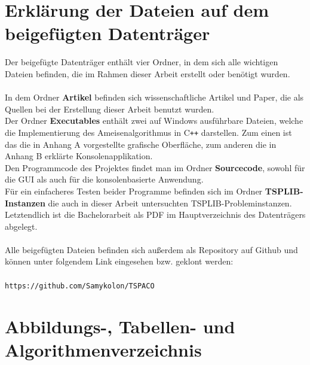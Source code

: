\documentclass[doktyp=barbeit, sprache=german]{TUBAFarbeiten}
\begin{document}
\section{Erklärung der Dateien auf dem beigefügten Datenträger}
Der beigefügte Datenträger enthält vier Ordner, in dem sich alle wichtigen Dateien befinden, die im Rahmen dieser Arbeit erstellt oder benötigt wurden.
\\\\In dem Ordner \textbf{Artikel} befinden sich wissenschaftliche Artikel und Paper, die als Quellen bei der Erstellung dieser Arbeit benutzt wurden. 
\\Der Ordner \textbf{Executables} enthält zwei auf Windows ausführbare Dateien, welche die Implementierung des Ameisenalgorithmus in C\texttt{++} darstellen. Zum einen ist das die in Anhang A vorgestellte grafische Oberfläche, zum anderen die in Anhang B erklärte Konsolenapplikation.
\\Den Programmcode des Projektes findet man im Ordner \textbf{Sourcecode}, sowohl für die GUI als auch für die konsolenbasierte Anwendung.
\\Für ein einfacheres Testen beider Programme befinden sich im Ordner \textbf{TSPLIB-Instanzen} die auch in dieser Arbeit untersuchten TSPLIB-Probleminstanzen.
\\Letztendlich ist die Bachelorarbeit als PDF im Hauptverzeichnis des Datenträgers abgelegt.
\\\\Alle beigefügten Dateien befinden sich außerdem als Repository auf Github und können unter folgendem Link eingesehen bzw. geklont werden:
\\\\\texttt{https://github.com/Samykolon/TSPACO}
\newpage
\section{Abbildungs-, Tabellen- und Algorithmenverzeichnis}
\listoffigures
\listoftables
\newpage
{}
\newpage
{}
\end{document}
